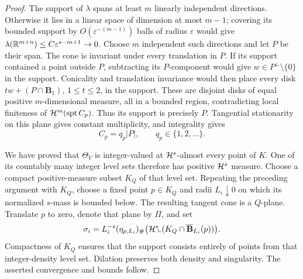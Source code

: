 \begin{proof}
The support of $\lambda$ spans at least $m$ linearly independent
directions. Otherwise it lies in a linear space of dimension at most
$m-1$; covering its bounded support by $O(\varepsilon^{-(m-1)})$
balls of radius $\varepsilon$ would give
$\lambda(\mathbb R^{m+n})\le C\varepsilon^{s-m+1}\to0$.
Choose $m$ independent such directions and let $P$ be their span.
The cone is invariant under every translation in $P$. If its support
contained a point outside $P$, subtracting its $P$-component would
give $w\in P^\perp\setminus\{0\}$ in the support. Conicality and
translation invariance would then place every disk
$tw+(P\cap\mathbf B_1)$, $1\le t\le2$, in the support. These are
disjoint disks of equal positive $m$-dimensional measure, all in a
bounded region, contradicting local finiteness of
$\mathcal H^m(\operatorname{spt} C_p)$. Thus its support is precisely $P$.
Tangential stationarity on this plane gives constant multiplicity,
and integrality gives
\[
 C_p=q_p|P|,\qquad q_p\in\{1,2,\ldots\}.
\]

We have proved that $\Theta_V$ is integer-valued at
$\mathcal H^s$-almost every point of $K$. One of its countably many integer
level sets therefore has positive $\mathcal H^s$ measure. Choose a compact
positive-measure subset $K_Q$ of that level set. Repeating the
preceding argument with $K_Q$, choose a fixed point $p\in K_Q$ and
radii $L_i\downarrow0$ on which its normalized $s$-mass is bounded
below. The resulting tangent cone is a $Q$-plane. Translate $p$ to
zero, denote that plane by $\Pi$, and set
\[
 \sigma_i=L_i^{-s}(\eta_{p,L_i})_\#
       \big(\mathcal H^s\!\llcorner
          (K_Q\cap\overline{\mathbf B}_{L_i}(p))\big).
\]
Compactness of $K_Q$ ensures that the support consists entirely of
points from that integer-density level set. Dilation preserves both
density and singularity. The asserted convergence and bounds follow.
\end{proof}
